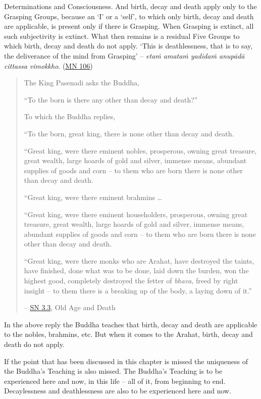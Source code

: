 Determinations and Consciousness. And birth, decay and death apply only to the Grasping Groups, because an `I' or a `self', to which only birth, decay and death are applicable, is present only if there is Grasping. When Grasping is extinct, all such subjectivity is extinct. What then remains is a residual  Five Groups to which birth, decay and death do not apply. `This is deathlessness, that is to say, the deliverance of the mind from Grasping' -- \emph{etaṁ amataṁ yadidaṁ anupādā cittassa vimokkho}. (\href{https://suttacentral.net/mn106/en/sujato}{MN 106})

\begin{quote}
The King Pasenadi asks the Buddha,

``To the born is there any other than decay and death?''

To which the Buddha replies,

``To the born, great king, there is none other than decay and death.

``Great king, were there eminent nobles, prosperous, owning great treasure, great wealth, large hoards of gold and silver, immense means, abundant supplies of goods and corn -- to them who are born there is none other than decay and death.

``Great king, were there eminent brahmins \ldots\hspace{0pt}

``Great king, were there eminent householders, prosperous, owning great treasure, great wealth, large hoards of gold and silver, immense means, abundant supplies of goods and corn -- to them who are born there is none other than decay and death.

``Great king, were there monks who are Arahat, have destroyed the taints, have finished, done what was to be done, laid down the burden, won the highest good, completely destroyed the fetter of \emph{bhava}, freed by right insight -- to them there is a breaking up of the body, a laying down of it.''

 -- \href{https://suttacentral.net/sn3.3/en/sujato}{SN 3.3}, Old Age and Death
\end{quote}

In the above reply the Buddha teaches that birth, decay and death are applicable to the nobles, brahmins, etc. But when it comes to the Arahat, birth, decay and death do not apply.

If the point that has been discussed in this chapter is missed the uniqueness of the Buddha's Teaching is also missed. The Buddha's Teaching is to be experienced here and now, in this life -- all of it, from beginning to end. Decaylessness and deathlessness are also to be experienced here and now.
